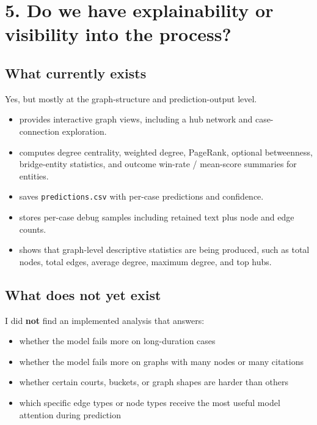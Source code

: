 \documentclass[12pt,a4paper]{article}
\begin{document}
\section*{5. Do we have explainability or visibility into the process?}

\subsection*{What currently exists}

Yes, but mostly at the graph-structure and prediction-output level.

\begin{itemize}[noitemsep]
\item {} provides interactive graph views, including a hub network and case-connection exploration.
\item {} computes degree centrality, weighted degree, PageRank, optional betweenness, bridge-entity statistics, and outcome win-rate / mean-score summaries for entities.
\item {} saves \texttt{predictions.csv} with per-case predictions and confidence.
\item {} stores per-case debug samples including retained text plus node and edge counts.
\item {} shows that graph-level descriptive statistics are being produced, such as total nodes, total edges, average degree, maximum degree, and top hubs.
\end{itemize}

\subsection*{What does not yet exist}

I did \textbf{not} find an implemented analysis that answers:

\begin{itemize}[noitemsep]
\item whether the model fails more on long-duration cases
\item whether the model fails more on graphs with many nodes or many citations
\item whether certain courts, buckets, or graph shapes are harder than others
\item which specific edge types or node types receive the most useful model attention during prediction
\end{itemize}
\end{document}
